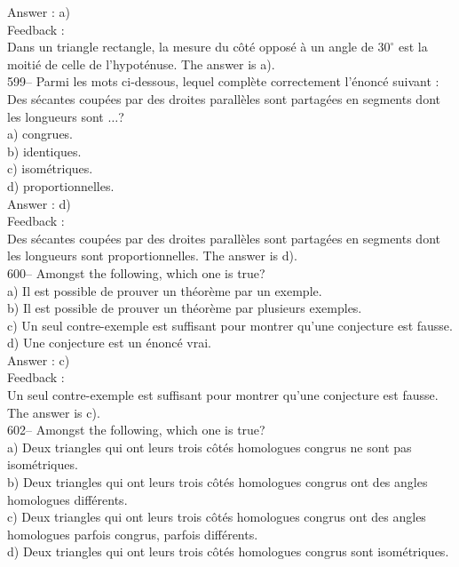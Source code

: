 ﻿\documentclass[letterpaper, 12pt]{article}
\begin{document}
Answer : a)\\

Feedback : \\
Dans un triangle rectangle, la mesure du c\^ot\'e oppos\'e \`a un angle de
$30^{\circ}$ est la moiti\'e de celle de l'hypot\'enuse.  The answer is
a).\\

599-- Parmi les mots ci-dessous, lequel compl\`ete correctement
l'\'enonc\'e suivant : \og Des s\'ecantes coup\'ees par des droites
parall\`eles sont partag\'ees en segments dont les longueurs sont $\ldots$\fg?\\
a) congrues.\\
b) identiques.\\
c) isom\'etriques.\\
d) proportionnelles.\\

Answer : d)\\

Feedback : \\
Des s\'ecantes coup\'ees par des droites parall\`eles sont partag\'ees en
segments dont les longueurs sont proportionnelles.  The answer is d).\\

600-- Amongst the following, which one is true?\\
a) Il est possible de prouver un th\'eor\`eme par un exemple.\\
b) Il est possible de prouver un th\'eor\`eme par plusieurs exemples.\\
c) Un seul contre-exemple est suffisant pour montrer qu'une conjecture est
fausse.\\
d) Une conjecture est un \'enonc\'e vrai.\\

Answer : c)\\

Feedback : \\
Un seul contre-exemple est suffisant pour montrer qu'une conjecture est
fausse.  The answer is c).\\



602-- Amongst the following, which one is true?\\
a) Deux triangles qui ont leurs trois c\^ot\'es homologues congrus ne sont
pas isom\'etriques.\\
b) Deux triangles qui ont leurs trois c\^ot\'es homologues congrus ont des
angles homologues diff\'erents.\\
c) Deux triangles qui ont leurs trois c\^ot\'es homologues congrus ont des
angles homologues parfois congrus, parfois diff\'erents.\\
d) Deux triangles qui ont leurs trois c\^ot\'es homologues congrus sont
isom\'etriques.\\
\end{document}
